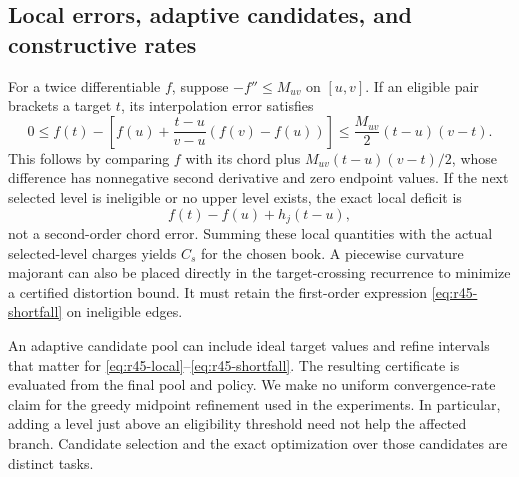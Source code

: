 \subsection{Local errors, adaptive candidates, and constructive rates}
For a twice differentiable $f$, suppose $-f''\leq M_{uv}$ on $[u,v]$. If an eligible pair brackets a target $t$, its interpolation error satisfies
\begin{equation}\label{eq:r45-local}
 0\leq f(t)-\left[f(u)+\frac{t-u}{v-u}(f(v)-f(u))\right]
 \leq\frac{M_{uv}}2(t-u)(v-t).
\end{equation}
This follows by comparing $f$ with its chord plus $M_{uv}(t-u)(v-t)/2$, whose difference has nonnegative second derivative and zero endpoint values. If the next selected level is ineligible or no upper level exists, the exact local deficit is
\begin{equation}\label{eq:r45-shortfall}
 f(t)-f(u)+h_j(t-u),
\end{equation}
not a second-order chord error. Summing these local quantities with the actual selected-level charges yields $C_s$ for the chosen book. A piecewise curvature majorant can also be placed directly in the target-crossing recurrence to minimize a certified distortion bound. It must retain the first-order expression \eqref{eq:r45-shortfall} on ineligible edges.

An adaptive candidate pool can include ideal target values and refine intervals that matter for \eqref{eq:r45-local}--\eqref{eq:r45-shortfall}. The resulting certificate is evaluated from the final pool and policy. We make no uniform convergence-rate claim for the greedy midpoint refinement used in the experiments. In particular, adding a level just above an eligibility threshold need not help the affected branch. Candidate selection and the exact optimization over those candidates are distinct tasks.

